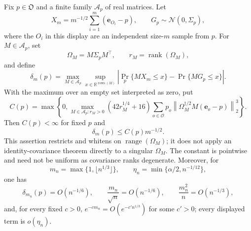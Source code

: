 Fix \(p\in\mathfrak O\) and a finite family \(\mathcal A_p\) of real matrices.  Let
\[
X_m=m^{-1/2}\sum_{i=1}^m(\mathbf e_{O_i}-p),
\qquad G_p\sim\mathcal N(0,\Sigma_p),
\]
where the \(O_i\) in this display are an independent size-\(m\) sample from \(p\).  For \(M\in\mathcal A_p\), set
\[
\Omega_M=M\Sigma_pM^{\top},\qquad r_M=\operatorname{rank}(\Omega_M),
\]
and define
\[
\delta_m(p)=\max_{M\in\mathcal A_p}\sup_{x\in\mathbb R^{\operatorname{rows}(M)}}
\left|\Pr_p\{MX_m\leq x\}-\Pr\{MG_p\leq x\}\right|.
\]
With the maximum over an empty set interpreted as zero, put
\[
C(p)=\max\left\{0,\max_{M\in\mathcal A_p:r_M>0}
\left(42r_M^{1/4}+16\right)
\sum_{o\in\mathcal O}p_o
\left\|\Omega_M^{\dagger/2}M(\mathbf e_o-p)\right\|_2^3\right\}.
\]
Then \(C(p)<\infty\) for fixed \(p\) and
\[
\delta_m(p)\leq C(p)m^{-1/2}.
\]
This assertion restricts and whitens on \(\operatorname{range}(\Omega_M)\); it does not apply an identity-covariance theorem directly to a singular \(\Omega_M\).  The constant is pointwise and need not be uniform as covariance ranks degenerate.  Moreover, for
\[
m_n=\max\{1,\lfloor n^{1/3}\rfloor\},
\qquad
\eta_n=\min\{\alpha/2,n^{-1/12}\},
\]
one has
\[
\delta_{m_n}(p)=O(n^{-1/6}),\qquad
\frac{m_n}{\sqrt n}=O(n^{-1/6}),\qquad
\frac{m_n^2}{n}=O(n^{-1/3}),
\]
and, for every fixed \(c>0\), \(e^{-cm_n}=O(e^{-c'n^{1/3}})\) for some \(c'>0\); every displayed term is \(o(\eta_n)\).